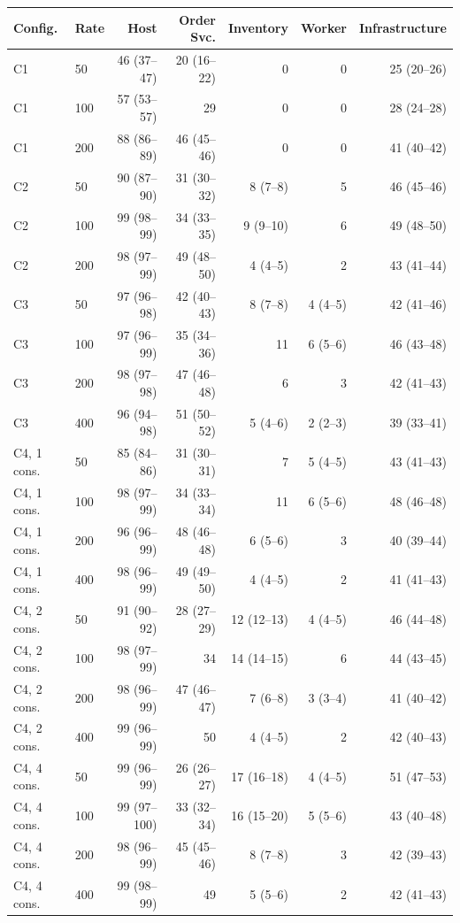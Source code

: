 \begin{tabular}{llrrrrr}
\toprule
Config. & Rate & Host & Order Svc. & Inventory & Worker & Infrastructure \\
\midrule
C1 & 50 & 46 (37--47) & 20 (16--22) & 0 & 0 & 25 (20--26) \\
C1 & 100 & 57 (53--57) & 29 & 0 & 0 & 28 (24--28) \\
C1 & 200 & 88 (86--89) & 46 (45--46) & 0 & 0 & 41 (40--42) \\
\addlinespace[2pt]
C2 & 50 & 90 (87--90) & 31 (30--32) & 8 (7--8) & 5 & 46 (45--46) \\
C2 & 100 & 99 (98--99) & 34 (33--35) & 9 (9--10) & 6 & 49 (48--50) \\
C2 & 200 & 98 (97--99) & 49 (48--50) & 4 (4--5) & 2 & 43 (41--44) \\
\addlinespace[2pt]
C3 & 50 & 97 (96--98) & 42 (40--43) & 8 (7--8) & 4 (4--5) & 42 (41--46) \\
C3 & 100 & 97 (96--99) & 35 (34--36) & 11 & 6 (5--6) & 46 (43--48) \\
C3 & 200 & 98 (97--98) & 47 (46--48) & 6 & 3 & 42 (41--43) \\
C3 & 400 & 96 (94--98) & 51 (50--52) & 5 (4--6) & 2 (2--3) & 39 (33--41) \\
\addlinespace[2pt]
C4, 1 cons. & 50 & 85 (84--86) & 31 (30--31) & 7 & 5 (4--5) & 43 (41--43) \\
C4, 1 cons. & 100 & 98 (97--99) & 34 (33--34) & 11 & 6 (5--6) & 48 (46--48) \\
C4, 1 cons. & 200 & 96 (96--99) & 48 (46--48) & 6 (5--6) & 3 & 40 (39--44) \\
C4, 1 cons. & 400 & 98 (96--99) & 49 (49--50) & 4 (4--5) & 2 & 41 (41--43) \\
\addlinespace[2pt]
C4, 2 cons. & 50 & 91 (90--92) & 28 (27--29) & 12 (12--13) & 4 (4--5) & 46 (44--48) \\
C4, 2 cons. & 100 & 98 (97--99) & 34 & 14 (14--15) & 6 & 44 (43--45) \\
C4, 2 cons. & 200 & 98 (96--99) & 47 (46--47) & 7 (6--8) & 3 (3--4) & 41 (40--42) \\
C4, 2 cons. & 400 & 99 (96--99) & 50 & 4 (4--5) & 2 & 42 (40--43) \\
\addlinespace[2pt]
C4, 4 cons. & 50 & 99 (96--99) & 26 (26--27) & 17 (16--18) & 4 (4--5) & 51 (47--53) \\
C4, 4 cons. & 100 & 99 (97--100) & 33 (32--34) & 16 (15--20) & 5 (5--6) & 43 (40--48) \\
C4, 4 cons. & 200 & 98 (96--99) & 45 (45--46) & 8 (7--8) & 3 & 42 (39--43) \\
C4, 4 cons. & 400 & 99 (98--99) & 49 & 5 (5--6) & 2 & 42 (41--43) \\
\bottomrule
\end{tabular}
